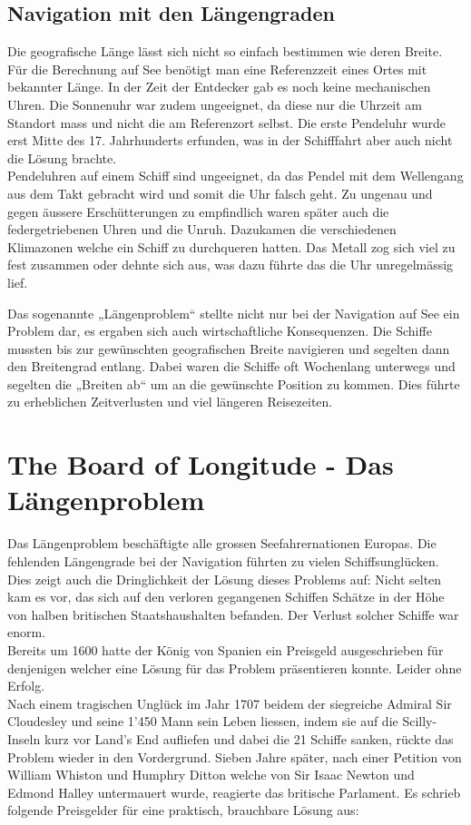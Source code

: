 \begin{refsection}
\subsection{Navigation mit den Längengraden}
Die geografische Länge lässt sich nicht so einfach bestimmen wie deren Breite. Für die Berechnung auf See benötigt man eine Referenzzeit eines Ortes mit bekannter Länge.
In der Zeit der Entdecker gab es noch keine mechanischen Uhren. Die Sonnenuhr war zudem ungeeignet, da diese nur die Uhrzeit am Standort mass und nicht die am Referenzort selbst. Die erste Pendeluhr wurde erst Mitte des 17. Jahrhunderts erfunden, was in der Schifffahrt aber auch nicht die Lösung brachte.\\
Pendeluhren auf einem Schiff sind ungeeignet, da das Pendel mit dem Wellengang aus dem Takt gebracht wird und somit die Uhr falsch geht.
Zu ungenau und gegen äussere Erschütterungen zu empfindlich waren später auch die federgetriebenen Uhren und die Unruh. Dazukamen die verschiedenen Klimazonen welche ein Schiff zu durchqueren hatten. Das Metall zog sich viel zu fest zusammen oder dehnte sich aus, was dazu führte das die Uhr unregelmässig lief.

Das sogenannte „Längenproblem“ stellte nicht nur bei der Navigation auf See ein Problem dar, es ergaben sich auch wirtschaftliche Konsequenzen. Die Schiffe mussten bis zur gewünschten geografischen Breite navigieren und segelten dann den Breitengrad entlang. Dabei waren die Schiffe oft Wochenlang unterwegs und segelten die „Breiten ab“ um an die gewünschte Position zu kommen. Dies führte zu erheblichen Zeitverlusten und viel längeren Reisezeiten.


\section{The Board of Longitude - Das Längenproblem}
Das Längenproblem beschäftigte alle grossen Seefahrernationen Europas. Die fehlenden Längengrade bei der Navigation führten zu vielen Schiffsunglücken. Dies zeigt auch die Dringlichkeit der Lösung dieses Problems auf: Nicht selten kam es vor, das sich auf den verloren gegangenen Schiffen Schätze in der Höhe von halben britischen Staatshaushalten befanden. Der Verlust solcher Schiffe war enorm.\\
Bereits um 1600 hatte der König von Spanien ein Preisgeld ausgeschrieben für denjenigen welcher eine Lösung für das Problem präsentieren konnte. Leider ohne Erfolg. \\
Nach einem tragischen Unglück im Jahr 1707 beidem der siegreiche Admiral Sir Cloudesley und seine 1’450 Mann sein Leben liessen, indem sie auf die Scilly-Inseln kurz vor Land’s End aufliefen und dabei die 21 Schiffe sanken, rückte das Problem wieder in den Vordergrund.
Sieben Jahre später, nach einer Petition von William Whiston und Humphry Ditton welche von Sir Isaac Newton und Edmond Halley untermauert wurde, reagierte das britische Parlament.
Es schrieb folgende Preisgelder für eine praktisch, brauchbare Lösung aus:\\


\end{refsection}
